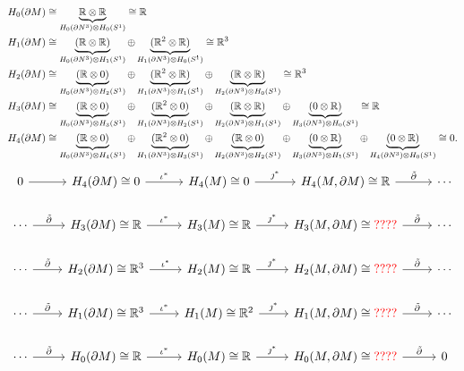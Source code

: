 \documentclass{article}
\begin{document}
\begin{align*}
    H_0(\partial M) &\cong \underbrace{\mathbb{R} \otimes \mathbb{R}}_{H_0(\partial N^3)\otimes H_0(S^1)} \cong \mathbb{R} \\
    H_1(\partial M) &\cong \underbrace{(\mathbb{R} \otimes \mathbb{R})}_{H_0(\partial N^3)\otimes H_1(S^1)} \oplus \underbrace{(\mathbb{R}^2 \otimes \mathbb{R})}_{H_1(\partial N^3)\otimes H_0(S^1)} \cong \mathbb{R}^3 \\
    H_2(\partial M) &\cong \underbrace{(\mathbb{R} \otimes 0)}_{H_0(\partial N^3)\otimes H_2(S^1)} \oplus \underbrace{(\mathbb{R}^2 \otimes \mathbb{R})}_{H_1(\partial N^3)\otimes H_1(S^1)} \oplus \underbrace{(\mathbb{R} \otimes \mathbb{R})}_{H_2(\partial N^3)\otimes H_0(S^1)} \cong \mathbb{R}^3\\
    H_3(\partial M) &\cong \underbrace{(\mathbb{R} \otimes 0)}_{H_0(\partial N^3)\otimes H_3(S^1)} \oplus \underbrace{(\mathbb{R}^2 \otimes 0)}_{H_1(\partial N^3)\otimes H_2(S^1)} \oplus \underbrace{(\mathbb{R} \otimes \mathbb{R})}_{H_2(\partial N^3)\otimes H_1(S^1)} \oplus \underbrace{(0 \otimes \mathbb{R})}_{H_3(\partial N^3)\otimes H_0(S^1)} \cong \mathbb{R}\\
    H_4(\partial M) &\cong \underbrace{(\mathbb{R} \otimes 0)}_{H_0(\partial N^3)\otimes H_4(S^1)} \oplus \underbrace{(\mathbb{R}^2 \otimes 0)}_{H_1(\partial N^3)\otimes H_3(S^1)} \oplus \underbrace{(\mathbb{R} \otimes 0)}_{H_2(\partial N^3)\otimes H_2(S^1)} \oplus \underbrace{(0 \otimes \mathbb{R})}_{H_3(\partial N^3)\otimes H_1(S^1)} \oplus \underbrace{(0 \otimes \mathbb{R})}_{H_4(\partial N^3)\otimes H_0(S^1)} \cong 0.
\end{align*}
\[
\begin{tikzcd}
0 \arrow[r]                          & H_4(\partial M)\cong 0 \arrow[r, "\iota^*"]            & H_4(M)\cong 0 \arrow[r, "\jmath^*"]          & {H_4(M,\partial M)\cong \R} \arrow[r, "\tilde{\partial}"]          & \cdots \\
\cdots \arrow[r, "\tilde{\partial}"]                          & H_3(\partial M)\cong \R \arrow[r, "\iota^*"]            & H_3(M)\cong \R \arrow[r, "\jmath^*"]          & {H_3(M,\partial M)\cong \textcolor{red}{????}} \arrow[r, "\tilde{\partial}"]          & \cdots \\
\cdots \arrow[r, "\tilde{\partial}"] & H_2(\partial M)\cong \mathbb{R}^3 \arrow[r, "\iota^*"]   & H_2(M) \cong \R \arrow[r, "\jmath^*"]         & {H_2(M,\partial M)\cong \textcolor{red}{????}} \arrow[r, "\tilde{\partial}"] & \cdots \\
\cdots \arrow[r, "\tilde{\partial}"] & H_1(\partial M)\cong \mathbb{R}^3 \arrow[r, "\iota^*"] & H_1(M)\cong \mathbb{R}^2 \arrow[r, "\jmath^*"] & {H_1(M,\partial M)\cong\textcolor{red}{????}} \arrow[r, "\tilde{\partial}"]          & \cdots \\
\cdots \arrow[r, "\tilde{\partial}"] & H_0(\partial M)\cong \mathbb{R} \arrow[r, "\iota^*"]   & H_0(M)\cong \mathbb{R} \arrow[r, "\jmath^*"] & {H_0(M,\partial M)\cong \textcolor{red}{????}} \arrow[r, "\tilde{\partial}"]          & 0     
\end{tikzcd}
\]
\end{document}
